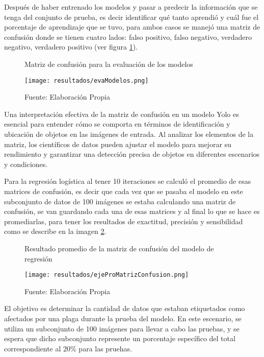 Después de haber entrenado los modelos y pasar a predecir la información que se tenga del  conjunto de prueba, es decir identificar qué tanto aprendió y cuál fue el porcentaje de aprendizaje que se tuvo, para ambos casos se manejó una matriz de confusión donde se tienen cuatro lados: falso positivo, falso negativo, verdadero negativo, verdadero positivo (ver figura \ref{fig:figuraEvaModelos}).

\newpage

\begin{figure}[h]
\centering
\caption{Matriz de confusión para la evaluación de los modelos}
\texttt{[image: resultados/evaModelos.png]}
\caption*{\footnotesize Fuente: Elaboración Propia}
\label{fig:figuraEvaModelos}
\end{figure}

Una interpretación efectiva de la matriz de confusión en un modelo Yolo es esencial para entender cómo se comporta en términos de identificación y ubicación de objetos en las imágenes de entrada. Al analizar los elementos de la matriz, los científicos de datos pueden ajustar el modelo para mejorar su rendimiento y garantizar una detección precisa de objetos en diferentes escenarios y condiciones.

Para la regresión logística al tener 10 iteraciones se calculó el promedio de esas matrices de confusión, es decir que cada vez que se pasaba el modelo en este subconjunto de datos de 100 imágenes se estaba calculando una matriz de confusión, se van guardando cada una de esas matrices y al final lo que se hace es promediarlas, para tener los resultados de exactitud, precisión y sensibilidad como se describe en la imagen \ref{fig:figuraEjeProMatrizConfusion}.


\newpage

\begin{figure}[h]
\centering
\caption{Resultado promedio de la matriz de confusión del modelo de regresión}
\texttt{[image: resultados/ejeProMatrizConfusion.png]}
\caption*{\footnotesize Fuente: Elaboración Propia}
\label{fig:figuraEjeProMatrizConfusion}
\end{figure}

El objetivo es determinar la cantidad de datos que estaban etiquetados como afectados por una plaga durante la prueba del modelo. En este escenario, se utiliza un subconjunto de 100 imágenes para llevar a cabo las pruebas, y se espera que dicho subconjunto represente un porcentaje específico del total correspondiente al 20\% para las pruehas.

